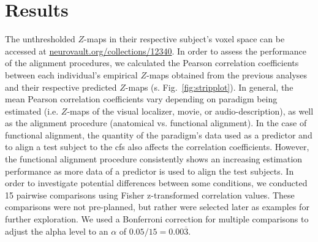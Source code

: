\section{Results}


\begin{comment}

``Because the localizer task comprises several scanning runs, we calculated the
reliability of the localizer across runs with Cronbach's $\alpha$ to provide an
estimate of the noise ceiling for these correlations'' \citep{jiahui2022cross}.

\end{comment}


The unthresholded $Z$-maps in their respective subject's voxel space can be
accessed at
\href{https://identifiers.org/neurovault.collection:12340}{\url{neurovault.org/collections/12340}}.
%
In order to assess the performance of the alignment procedures, we calculated
the Pearson correlation coefficients between each individual's empirical
$Z$-maps obtained from the previous analyses \citep{haeusler2022processing,
sengupta2016extension} and their respective predicted $Z$-maps (s.
Fig.~\ref{fig:stripplot}).
%
In general, the mean Pearson correlation coefficients vary depending on paradigm
being estimated (i.e. $Z$-maps of the visual localizer, movie, or
audio-description), as well as the alignment procedure (anatomical vs.
functional alignment).
%
In the case of functional alignment, the quantity of the paradigm's data used as
a predictor and to align a test subject to the \ac{cfs} also affects the
correlation coefficients.
%
However, the functional alignment procedure consistently shows an increasing
estimation performance as more data of a predictor is used to align the test
subjects.
%
In order to investigate potential differences between some conditions, we
conducted 15 pairwise comparisons using Fisher z-transformed correlation values.
%
These comparisons were not pre-planned, but rather were selected later as
examples for further exploration.
%
We used a Bonferroni correction for multiple comparisons to adjust the alpha
level to an $\alpha$ of $0.05 / 15 = 0.00\overline{3}$.


